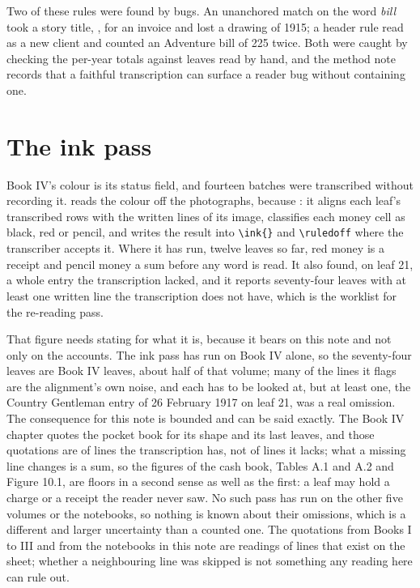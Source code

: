 Two of these rules were found by bugs. An unanchored match on the word \emph{bill} took a story title, , for an invoice and lost a drawing of 1915; a header rule read  as a new client and counted an Adventure bill of 225 twice. Both were caught by checking the per-year totals against leaves read by hand, and the method note records that a faithful transcription can surface a reader bug without containing one.

\section{The ink pass}

Book IV's colour is its status field, and fourteen batches were transcribed without recording it.  reads the colour off the photographs, because : it aligns each leaf's transcribed rows with the written lines of its image, classifies each money cell as black, red or pencil, and writes the result into \verb|\ink{}| and \verb|\ruledoff| where the transcriber accepts it. Where it has run, twelve leaves so far, red money is a receipt and pencil money a sum before any word is read. It also found, on leaf 21, a whole entry the transcription lacked, and it reports seventy-four leaves with at least one written line the transcription does not have, which is the worklist for the re-reading pass.

That figure needs stating for what it is, because it bears on this note and not only on the accounts. The ink pass has run on Book IV alone, so the seventy-four leaves are Book IV leaves, about half of that volume; many of the lines it flags are the alignment's own noise, and each has to be looked at, but at least one, the Country Gentleman entry of 26 February 1917 on leaf 21, was a real omission. The consequence for this note is bounded and can be said exactly. The Book IV chapter quotes the pocket book for its shape and its last leaves, and those quotations are of lines the transcription has, not of lines it lacks; what a missing line changes is a sum, so the figures of the cash book, Tables A.1 and A.2 and Figure 10.1, are floors in a second sense as well as the first: a leaf may hold a charge or a receipt the reader never saw. No such pass has run on the other five volumes or the notebooks, so nothing is known about their omissions, which is a different and larger uncertainty than a counted one. The quotations from Books I to III and from the notebooks in this note are readings of lines that exist on the sheet; whether a neighbouring line was skipped is not something any reading here can rule out.

